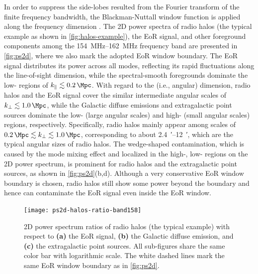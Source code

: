 \documentclass[modern]{aastex62}
\newcommand{\klos}{\text{$k_{\parallel}$}}
\newcommand{\kperp}{\text{$k_{\bot}$}}
\begin{document}
In order to suppress the side-lobes resulted from the Fourier transform of
the finite frequency bandwidth, the Blackman-Nuttall window function is
applied along the frequency dimension \citep[e.g.,][]{trott2015,chapman2016}.
The 2D power spectra of radio halos (the typical example as shown in
\autoref{fig:halos-example}), the EoR signal, and other
foreground components among the \SIrange{154}{162}{\MHz} frequency band
are presented in \autoref{fig:ps2d},
where we also mark the adopted EoR window boundary.
The EoR signal distributes its power across all \klos{} modes, reflecting
its rapid fluctuations along the line-of-sight dimension,
while the spectral-smooth foregrounds dominate the low-\klos{} regions
of $\klos{} \lesssim \SI{0.2}{\per\Mpc}$.
With regard to the \kperp{} (i.e., angular) dimension,
radio halos and the EoR signal cover the similar intermediate angular
scales of $\kperp \lesssim \SI{1.0}{\per\Mpc}$,
while the Galactic diffuse emissions and extragalactic point sources
dominate the low-\kperp{} (large angular scales) and high-\kperp{}
(small angular scales) regions, respectively.
Specifically, radio halos mainly appear among scales of
$\SI{0.2}{\per\Mpc} \lesssim \kperp \lesssim \SI{1.0}{\per\Mpc}$,
corresponding to about \SIrange[range-units=repeat]{2.4}{12}{\arcminute},
which are the typical angular sizes of radio halos.
The wedge-shaped contamination, which is caused by the mode mixing effect
and localized in the high-\kperp{}, low-\klos{} regions on the 2D power
spectrum, is prominent for radio halos and the extragalactic point
sources, as shown in \autoref{fig:ps2d}(b,d).
Although a very conservative EoR window boundary is chosen, radio halos
still show some power beyond the boundary and hence can contaminate the
EoR signal even inside the EoR window.

\begin{figure}
  \centering
  \texttt{[image: ps2d-halos-ratio-band158]}
  \caption{\label{fig:ps2d-ratio}%
    2D power spectrum ratios of radio halos (the typical example) with
    respect to
    \textbf{(a)} the EoR signal,
    \textbf{(b)} the Galactic diffuse emission,
    and
    \textbf{(c)} the extragalactic point sources.
    All sub-figures share the same color bar with logarithmic scale.
    The white dashed lines mark the same EoR window boundary as in
    \autoref{fig:ps2d}.
  }
\end{figure}
\end{document}
